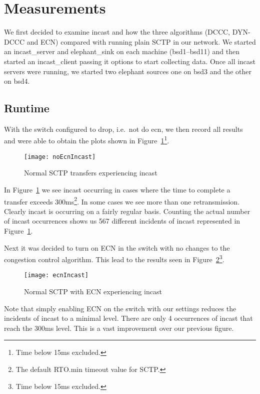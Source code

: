 \documentclass[12pt]{article}
\begin{document}
\section{Measurements}
\label{measure}
We first decided to examine incast and how the three algorithms (DCCC, DYN-DCCC and ECN) compared with
running plain SCTP in our network. We started an incast\_server and elephant\_sink on each machine (bsd1--bsd11) and then 
started an incast\_client passing it options to start collecting data. Once all incast servers were running, we started two elephant sources one on bsd3 and the other on bsd4.

\subsection{Runtime}
With the switch configured to drop, i.e.~not do ecn, we
then record all results and were able to obtain the plots shown in Figure~\ref{fig:noEcnIncast}\footnote{Time below 15ms excluded.}.

\begin{figure}[!h]
\centering
\texttt{[image: noEcnIncast]}
\caption{Normal SCTP transfers experiencing incast}
\label{fig:noEcnIncast}
\end{figure}

In Figure~\ref{fig:noEcnIncast} we see incast occurring in cases where the time to complete a transfer exceeds
300ms\footnote{The default RTO.min timeout value for SCTP.}. In some cases we see more than
one retransmission. Clearly incast is occurring on a fairly regular basis. Counting the actual number
of incast occurrences shows us 567 different incidents of incast  represented in Figure~\ref{fig:noEcnIncast}.


Next it was decided to turn on ECN in the switch with no changes to the congestion control algorithm. This
lead to the results seen in Figure~\ref{fig:ecnIncast}\footnote{Time below 15ms excluded.}.

\begin{figure}[!h]
\centering
\texttt{[image: ecnIncast]}
\caption{Normal SCTP with ECN experiencing incast}
\label{fig:ecnIncast}
\end{figure}


Note that simply enabling ECN on the switch with our settings reduces the incidents of incast to a minimal
level. There are only 4 occurrences of incast that reach the 300ms level. This is a vast improvement over
our previous figure.  
\end{document}

